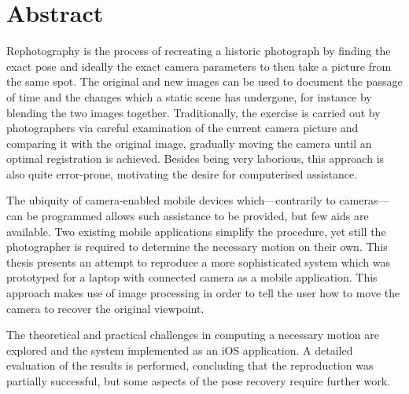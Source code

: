 \chapter*{Abstract}

Rephotography is the process of recreating a historic photograph by finding the
exact pose and ideally the exact camera parameters to then take a picture from
the same spot. The original and new images
can be used to document the passage of time and the changes which a static scene
has undergone, for instance by blending the two images together. Traditionally,
the exercise is carried out by photographers via careful examination of the
current camera picture and comparing it with the original image, gradually
moving the camera until an optimal registration is achieved. Besides being very
laborious, this approach is also quite error-prone, motivating the desire for
computerised assistance.

The ubiquity of camera-enabled mobile devices which---contrarily to
cameras---can be programmed allows such assistance to be provided, but few aids
are available. Two existing mobile applications simplify the procedure, yet still the
photographer is required to determine the necessary motion on their own. This
thesis presents an attempt to reproduce a more sophisticated system which was
prototyped for a laptop with connected camera as a mobile application. This
approach makes use of image processing in order to tell the user how to move the
camera to recover the original viewpoint.

The theoretical and practical challenges in computing a necessary motion are
explored and the system implemented as an iOS application. A detailed
evaluation of the results is performed, concluding that the reproduction was
partially successful, but some aspects of the pose recovery require further work.
